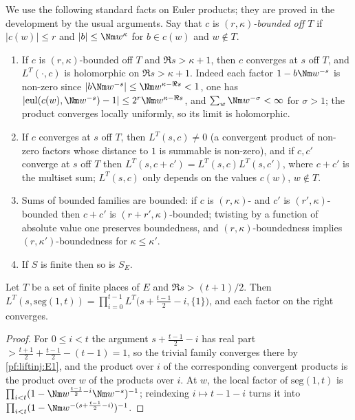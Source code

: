 We use the following standard facts on Euler products; they are proved in the development by the usual
arguments. Say that $c$ is \emph{$(r,\kappa)$-bounded off $T$} if $|c(w)|\le r$ and $|b|\le\Nm w^{\kappa}$ for
$b\in c(w)$ and $w\notin T$.
\begin{enumerate}[label=(E\arabic*)]
\item\label{pf:liftinj:E1} If $c$ is $(r,\kappa)$-bounded off $T$ and $\Re s>\kappa+1$, then $c$ converges at $s$
off $T$, and $L^T(\cdot,c)$ is holomorphic on $\Re s>\kappa+1$. Indeed each factor $1-b\Nm w^{-s}$ is non-zero
since $|b\Nm w^{-s}|\le\Nm w^{\kappa-\Re s}<1$, one has
$|\mathrm{eul}(c(w),\Nm w^{-s})-1|\le2^r\Nm w^{\kappa-\Re s}$, and $\sum_w\Nm w^{-\sigma}<\infty$ for $\sigma>1$;
the product converges locally uniformly, so its limit is holomorphic.
\item\label{pf:liftinj:E2} If $c$ converges at $s$ off $T$, then $L^T(s,c)\ne0$ (a convergent product of non-zero
factors whose distance to $1$ is summable is non-zero), and if $c,c'$ converge at $s$ off $T$ then
$L^T(s,c+c')=L^T(s,c)L^T(s,c')$, where $c+c'$ is the multiset sum; $L^T(s,c)$ only depends on the values $c(w)$,
$w\notin T$.
\item\label{pf:liftinj:E3} Sums of bounded families are bounded: if $c$ is $(r,\kappa)$- and $c'$ is
$(r',\kappa)$-bounded then $c+c'$ is $(r+r',\kappa)$-bounded; twisting by a function of absolute value one
preserves boundedness, and $(r,\kappa)$-boundedness implies $(r,\kappa')$-boundedness for $\kappa\le\kappa'$.
\item\label{pf:liftinj:E4} If $S$ is finite then so is $S_E$.
\end{enumerate}

\begin{lemma}\label{pf:liftinj:segzeta}
Let $T$ be a set of finite places of $E$ and $\Re s>(t+1)/2$. Then
$L^T(s,\mathrm{seg}(1,t))=\prod_{i=0}^{t-1}L^T\bigl(s+\tfrac{t-1}2-i,\{1\}\bigr)$, and each factor on the right
converges.
\end{lemma}

\begin{proof}
For $0\le i<t$ the argument $s+\frac{t-1}2-i$ has real part $>\frac{t+1}2+\frac{t-1}2-(t-1)=1$, so the trivial
family converges there by \ref{pf:liftinj:E1}, and the product over $i$ of the corresponding convergent products
is the product over $w$ of the products over $i$. At $w$, the local factor of $\mathrm{seg}(1,t)$ is
$\prod_{i<t}(1-\Nm w^{\frac{t-1}2-i}\Nm w^{-s})^{-1}$; reindexing $i\mapsto t-1-i$ turns it into
$\prod_{i<t}(1-\Nm w^{-(s+\frac{t-1}2-i)})^{-1}$.
\end{proof}

